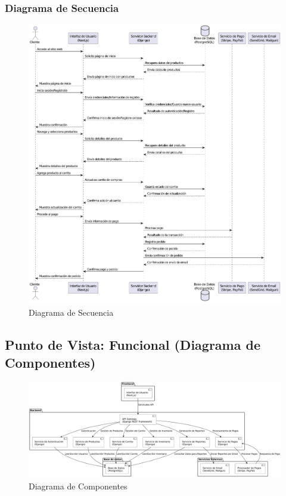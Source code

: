 \documentclass[12pt]{article}
\begin{document}
\subsubsection{Diagrama de Secuencia}
\begin{figure}[H]
    \centering
    \includegraphics[width=\textwidth]{img/DiagramaSecuencia.pdf}
    \caption{Diagrama de Secuencia}
    \label{fig:diagrama_secuencia}
\end{figure}

\subsection{Punto de Vista: Funcional (Diagrama de Componentes)}
\begin{figure}[H]
    \centering
    \includegraphics[width=\textwidth]{img/DiagramaComponentes.pdf}
    \caption{Diagrama de Componentes}
    \label{fig:diagrama_componentes}
\end{figure}
\end{document}
